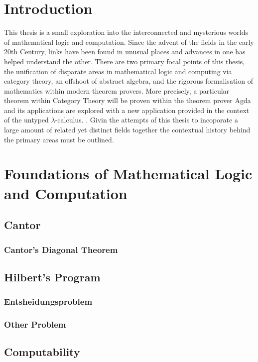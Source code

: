 
\section{Introduction}

This thesis is a small exploration into the interconnected and mysterious worlds
of mathematical logic and computation. Since the advent of the fields in the
early 20th Century, links have been found in unusual places and advances in one
has helped understand the other. There are two primary focal points of this
thesis, the unification of disparate areas in mathematical logic and computing
via category theory, an offshoot of abstract algebra, and the rigorous
formalisation of mathematics within modern theorem provers. More precisely, a
particular theorem within Category Theory will be proven within the theorem
prover Agda and its applications are explored with a new application provided in
the context of the untyped $\lambda$-calculus. .
Givin the attempts of this thesis to incoporate a large amount of related yet
distinct fields together the contextual history behind the primary areas must be
outlined.
\section{Foundations of Mathematical Logic and Computation}

\subsection{Cantor}
\subsubsection{Cantor's Diagonal Theorem}
\subsection{Hilbert's Program}
\subsubsection{Entsheidungsproblem}
\subsubsection{Other Problem}
\subsection{Computability}
